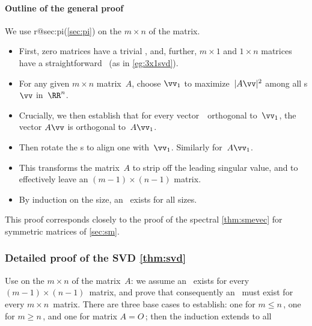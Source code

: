 \begin{example}
\begin{solution}
\end{solution}
\end{example}





\paragraph{Outline of the general proof} 
We use  
\ifcsname r@sec:pi\endcsname (\cref{sec:pi}) \fi
on the  \(m\times n\) of the matrix.
\begin{itemize}
\item First, zero matrices have a trivial \svd, and, further,
\(m\times 1\) and \(1\times n\) matrices have a straightforward \svd\ (as in \cref{eg:3x1svd}).
\item For any given \(m\times n\) matrix~\(A\), choose \(\vv_1\) to maximize~\(|A\vv|^2\) among all s \(\vv\) in~\(\RR^n\).
\item Crucially, we then establish that for every vector~\vv\ orthogonal to~\(\vv_1\), the vector \(A\vv\) is orthogonal to~\(A\vv_1\).
\item Then rotate the s to align one with~\(\vv_1\). Similarly for~\(A\vv_1\).  
\item This  transforms the matrix~\(A\) to strip off the leading singular value, and to effectively leave an \((m-1)\times(n-1)\) matrix.
\item  By induction on the size, an \svd\ exists for all sizes.
\end{itemize}
This proof corresponds closely to the proof of the spectral \cref{thm:smevec} for symmetric matrices of \cref{sec:sm}. 





\subsubsection{Detailed proof of the SVD \cref{thm:svd}}
\label{sec:dpsvdt}

Use  on the  \(m\times n\) of the matrix~\(A\): we assume an \svd\ exists for every \((m-1)\times(n-1)\)~matrix, and prove that consequently an \svd\ must exist for every \(m\times n\)~matrix.  
There are three base cases to establish: one for \(m\leq n\)\,, one for \(m\geq n\)\,, and one for matrix \(A=O\)\,; then the induction extends to all 

